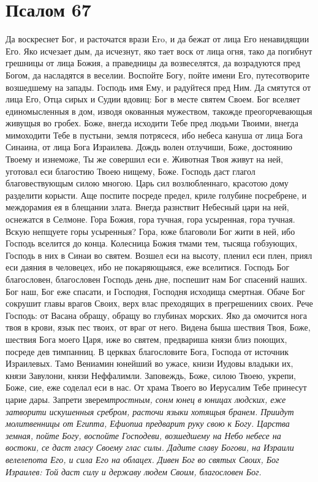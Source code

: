 \section{Псалом 67}
 


Да воскреснет Бог, и расточатся врази Еro, и да бежат от лица Его ненавидящии Его. Яко исчезает дым, да исчезнут, яко тает воск от лица огня, тако да погибнут грешницы от лица Божия, а праведницы да возвеселятся, да возрадуются пред Богом, да насладятся в веселии. Воспойте Богу, пойте имени Его, путесотворите возшедшему на запады. Господь имя Ему, и радуйтеся пред Ним. Да смятутся от лица Его, Отца сирых и Судии вдовиц: Бог в месте святем Своем. Бог вселяет единомысленныя в дом, изводя окованныя мужеством, такожде преогорчевающыя живущыя во гробех. Боже, внегда исходити Тебе пред людьми Твоими, внегда мимоходити Тебе в пустыни, земля потрясеся, ибо небеса кануша от лица Бога Синаина, от лица Бога Израилева. Дождь волен отлучиши, Боже, достоянию Твоему и изнеможе, Ты же совершил еси е. Животная Твоя живут на ней, уготовал еси благостию Твоею нищему, Боже. Господь даст глагол благовествующым силою многою. Царь сил возлюбленнаго, красотою дому разделити корысти. Аще поспите посреде предел, криле голубине посребрене, и междорамия ея в блещании злата. Внегда разнствит Небесный цари на ней, оснежатся в Селмоне. Гора Божия, гора тучная, гора усыренная, гора тучная. Вскую непщуете горы усыренныя? Гора, юже благоволи Бог жити в ней, ибо Господь вселится до конца. Колесница Божия тмами тем, тысяща гобзующих, Господь в них в Синаи во святем. Возшел еси на высоту, пленил еси плен, приял еси даяния в человецех, ибо не покаряющыяся, еже вселитися. Господь Бог благословен, благословен Господь день дне, поспешит нам Бог спасений наших. Бог наш, Бог еже спасати, и Господня, Господня исходища смертная. Обаче Бог сокрушит главы врагов Своих, верх влас преходящих в прегрешениих своих. Рече Господь: от Васана обращу, обращу во глубинах морских. Яко да омочится нога твоя в крови, язык пес твоих, от враг от него. Видена быша шествия Твоя, Боже, шествия Бога моего Царя, иже во святем, предвариша князи близ поющих, посреде дев тимпанниц. В церквах благословите Бога, Господа от источник Израилевых. Тамо Вениамин юнейший во ужасе, книзи Иудовы владыки их, князи Завулони, князи Неффалимли. Заповеждь, Боже, силою Твоею, укрепи, Боже, сие, еже соделал еси в нас. От храма Твоего во Иерусалим Тебе принесут царие дары. Запрети зверем\itshape  \normalfont{}тростным, сонм юнец в юницах людских, еже затворити искушенныя сребром, расточи языки хотящыя бранем. Приидут молитвенницы от Египта, Ефиопиа предварит руку свою к Богу. Царства земная, пойте Богу, воспойте Господеви, возшедшему на Небо небесе на востоки, се даст гласу Своему глас силы. Дадите славу Богови, на Израили велелепота Его, и сила Его на облацех. Дивен Бог во святых Своих, Бог Израилев: Той даст силу и державу людем Своим, благословен Бог.


